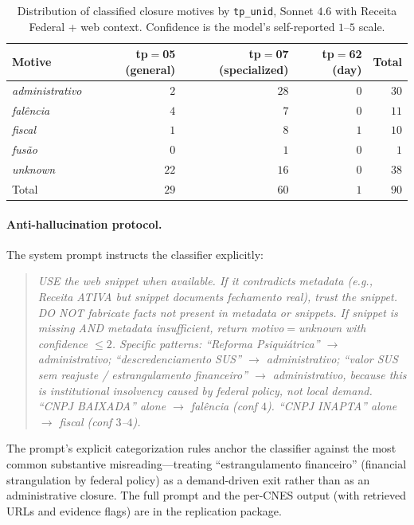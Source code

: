 \begin{table}[h!]
\centering
\caption{Distribution of classified closure motives by
\texttt{tp\_unid}, Sonnet $4.6$ with Receita Federal + web context.
Confidence is the model's self-reported $1$--$5$ scale.}
\label{tab:nlp-distribution}
\small
\begin{tabular}{lrrrr}
\toprule
Motive & tp$=$05 (general) & tp$=$07 (specialized) & tp$=$62 (day) & Total \\
\midrule
\emph{administrativo}     & $2$  & $28$ & $0$ & $30$ \\
\emph{fal\^encia}         & $4$  & $7$  & $0$ & $11$ \\
\emph{fiscal}             & $1$  & $8$  & $1$ & $10$ \\
\emph{fus\~ao}            & $0$  & $1$  & $0$ & $1$  \\
\emph{unknown}            & $22$ & $16$ & $0$ & $38$ \\
\midrule
Total                     & $29$ & $60$ & $1$ & $90$ \\
\bottomrule
\end{tabular}
\end{table}

\paragraph{Anti-hallucination protocol.} The system prompt instructs
the classifier explicitly:

\begin{quote}
\sloppy
\small\itshape
USE the web snippet when available. If it contradicts metadata
(e.g., Receita ATIVA but snippet documents fechamento real), trust the
snippet. DO NOT fabricate facts not present in metadata or snippets.
If snippet is missing AND metadata insufficient, return motivo$=$unknown
with confidence $\leq 2$. Specific patterns: ``Reforma Psiquiátrica''
$\to$ administrativo; ``descredenciamento SUS'' $\to$ administrativo;
``valor SUS sem reajuste / estrangulamento financeiro'' $\to$ administrativo,
because this is institutional insolvency caused by federal policy, not
local demand. ``CNPJ BAIXADA'' alone $\to$ fal\^encia (conf $4$).
``CNPJ INAPTA'' alone $\to$ fiscal (conf $3$--$4$).
\end{quote}

The prompt's explicit categorization rules anchor the classifier
against the most common substantive misreading---treating
``estrangulamento financeiro'' (financial strangulation by federal
policy) as a demand-driven exit rather than as an administrative
closure. The full prompt and the per-CNES output (with retrieved
URLs and evidence flags) are in the replication package.

